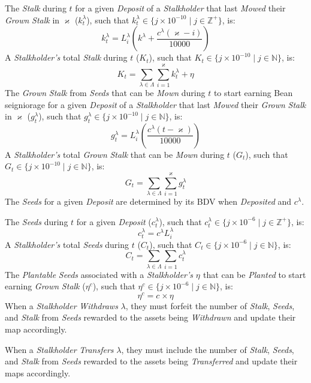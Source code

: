 \documentclass[tikz]{article}
\newcommand{\term}[1]{\textsl{#1}}
\newcommand{\bean}{} %
\begin{document}
The \term{Stalk} during $t$ for a given \term{Deposit} of a \term{Stalkholder} that last \term{Mowed} their \term{Grown} \term{Stalk} in $\varkappa$ ($k_{t}^{\lambda}$), such that $k_{t}^{\lambda} \in \{j \times 10^{-10} \mid j \in \mathbb{Z}^{+} \}$, is:
$$k_{t}^{\lambda} = L_i^{\lambda}\left(k^{\lambda} + \frac{c^{\lambda}(\varkappa - i)}{10000}\right)$$
A \term{Stalkholder's} total \term{Stalk} during $t$ ($K_t$), such that $K_t \in \{j \times 10^{-10} \mid j \in \mathbb{N} \}$, is:
$$K_t = \sum_{\lambda \in \Lambda} \sum_{i=1}^{\varkappa} k_{t}^{\lambda} + \eta^{\bean}$$
The \term{Grown} \term{Stalk} from \term{Seeds} that can be \term{Mown} during $t$ to start earning Bean seigniorage for a given \term{Deposit} of a \term{Stalkholder} that last \term{Mowed} their \term{Grown} \term{Stalk} in $\varkappa$ ($g_{t}^{\lambda}$), such that $g_{t}^{\lambda} \in \{j \times 10^{-10} \mid j \in \mathbb{N} \}$, is:
$$g_{t}^{\lambda} = L_i^{\lambda}\left(\frac{c^{\lambda}(t - \varkappa)}{10000}\right)$$
A \term{Stalkholder's} total \term{Grown} \term{Stalk} that can be \term{Mown} during $t$ ($G_t$), such that $G_t \in \{j \times 10^{-10} \mid j \in \mathbb{N} \}$, is:
$$G_t = \sum_{\lambda \in \Lambda} \sum_{i=1}^{\varkappa} g_{t}^{\lambda}$$
The \term{Seeds} for a given \term{Deposit} are determined by its BDV when \term{Deposited} and $c^{\lambda}$.

The \term{Seeds} during $t$ for a given \term{Deposit} ($c_{t}^{\lambda}$), such that $c_{t}^{\lambda} \in \{j \times 10^{-6} \mid j \in \mathbb{Z}^{+} \}$, is:
$$c_{t}^{\lambda} = c^{\lambda} L_i^{\lambda}$$
A \term{Stalkholder's} total \term{Seeds} during $t$ ($C_t$), such that $C_t \in \{j \times 10^{-6} \mid j \in \mathbb{N} \}$, is:
$$C_t = \sum_{\lambda \in \Lambda} \sum_{i=1} c_{t}^{\lambda}$$
The \term{Plantable} \term{Seeds} associated with a \term{Stalkholder's} $\eta^{\bean}$ that can be \term{Planted} to start earning \term{Grown} \term{Stalk} ($\eta^{c}$), such that $\eta^{c} \in \{j \times 10^{-6} \mid j \in \mathbb{N} \}$, is:
$$\eta^{c} = c^{\bean} \times \eta^{\bean}$$
When a \term{Stalkholder} \term{Withdraws} $\lambda$, they must forfeit the number of \term{Stalk}, \term{Seeds}, and \term{Stalk} from \term{Seeds} rewarded to the assets being \term{Withdrawn} and update their map accordingly.

When a \term{Stalkholder} \term{Transfers} $\lambda$, they must include the number of \term{Stalk}, \term{Seeds}, and \term{Stalk} from \term{Seeds} rewarded to the assets being \term{Transferred} and update their maps accordingly.
\end{document}
